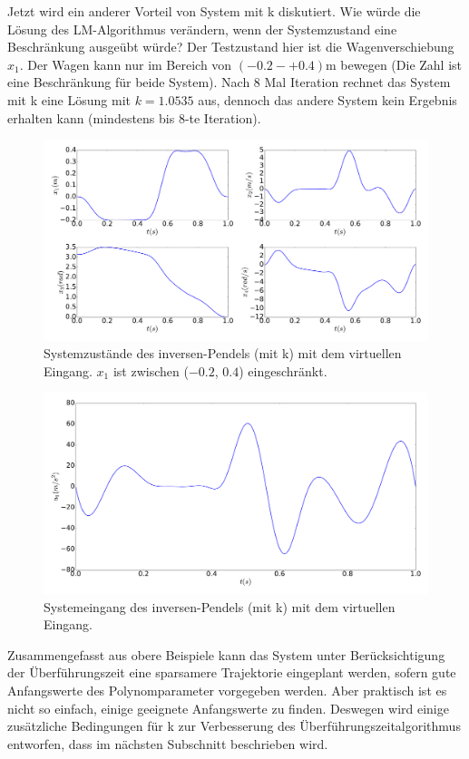 \begin{beispiel}
	Jetzt wird ein anderer Vorteil von System mit k diskutiert. Wie würde die Lösung des LM-Algorithmus verändern, wenn der Systemzustand eine Beschränkung ausgeübt würde? Der Testzustand hier ist die Wagenverschiebung $x_{1}$. Der Wagen kann nur im Bereich von $(-0.2-+0.4)$m bewegen (Die Zahl ist eine Beschränkung für beide System). Nach 8 Mal Iteration rechnet das System mit k eine Lösung mit $k=1.0535$ aus, dennoch das andere System kein Ergebnis erhalten kann (mindestens bis 8-te Iteration).
	
	\begin{figure}
		\centering
		\includegraphics[width=15.5cm]{bild/30_32/example0_mit_k_x_con.pdf}
		\caption{Systemzustände des inversen-Pendels (mit k) mit dem virtuellen Eingang. $x_{1}$ ist zwischen ($-0.2$, $0.4$) eingeschränkt.}
		\label{fig:Inverses_Pendel_mit_k_x_con}
	\end{figure}
	
	\begin{figure}
		\centering
		\includegraphics[width=12cm]{bild/30_32/example0_mit_k_u_con.pdf}
		\caption{Systemeingang des inversen-Pendels (mit k) mit dem virtuellen Eingang.}
		\label{fig:Inverses_Pendel_mit_k_u_con}
	\end{figure}

\end{beispiel}
\newpage
Zusammengefasst aus obere Beispiele kann das System unter Berücksichtigung der Überführungszeit eine sparsamere Trajektorie eingeplant werden, sofern gute Anfangswerte des Polynomparameter vorgegeben werden. Aber praktisch ist es nicht so einfach, einige geeignete Anfangswerte zu finden. Deswegen wird einige zusätzliche Bedingungen für k zur Verbesserung des Überführungszeitalgorithmus entworfen, dass im nächsten Subschnitt beschrieben wird.
